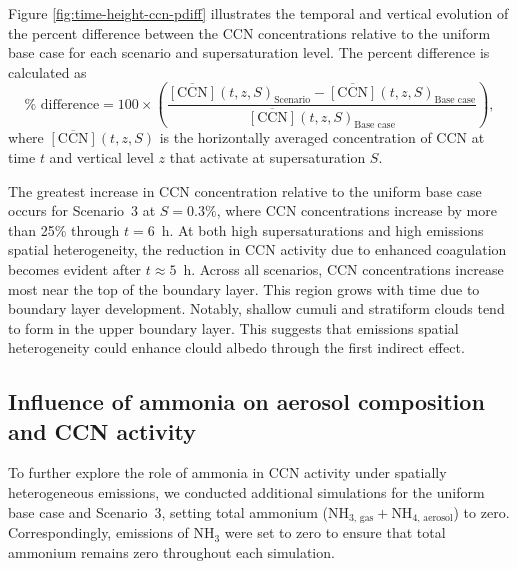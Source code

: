 \documentclass[journal abbreviation, manuscript]{copernicus}
\begin{document}
Figure \ref{fig:time-height-ccn-pdiff} illustrates the temporal and
vertical evolution of the percent difference between the CCN
concentrations relative to the uniform base case for each scenario and
supersaturation level. The percent difference is calculated as
\begin{equation}
    \% \text{ difference} = 100\times\left(\frac{\overline{[\text{CCN}]}(t, z, S)_{\text{Scenario}} - \overline{[\text{CCN}]}(t, z, S)_{\text{Base case}}}{\overline{[\text{CCN}]}(t, z, S)_{\text{Base case}}}\right),
\end{equation}
where $\overline{[\text{CCN}]}(t, z,S)$ is the horizontally averaged
concentration of CCN at time $t$ and vertical level $z$ that activate
at supersaturation $S$.

The greatest increase in CCN concentration relative to the uniform
base case occurs for Scenario~3 at $S=0.3\%$, where CCN concentrations
increase by more than 25\% through $t=6$~h. At both high
supersaturations and high emissions spatial heterogeneity, the
reduction in CCN activity due to enhanced coagulation becomes evident
after $t\approx5$~h.  Across all scenarios, CCN concentrations
increase most near the top of the boundary layer. This region grows
with time due to boundary layer development. Notably, shallow cumuli
and stratiform clouds tend to form in the upper boundary layer. This
suggests that emissions spatial heterogeneity could enhance clould
albedo through the first indirect effect.



\subsection{Influence of ammonia on aerosol composition and CCN activity}\label{sec:influence-ammonia}

To further explore the role of ammonia in CCN activity under spatially
heterogeneous emissions, we conducted additional simulations for the
uniform base case and Scenario~3, setting total ammonium
(NH$_{3\text{, gas}} + $NH$_{4\text{, aerosol}}$) to zero. Correspondingly, 
emissions of NH$_3$ were set to zero to ensure that total ammonium remains
zero throughout each simulation.
\end{document}
